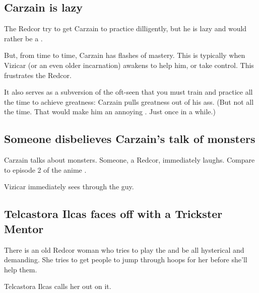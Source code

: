 \begin{garbage}
\subsection{Carzain is lazy}
The Redcor try to get Carzain to practice dilligently, but he is lazy and would rather be a \boheme. 

But, from time to time, Carzain has flashes of mastery. This is typically when Vizicar (or an even older incarnation) awakens to help him, or take control. This frustrates the Redcor. 

It also serves as a subversion of the oft-seen  that you must train and practice all the time to achieve greatness: Carzain pulls greatness out of his ass. (But not all the time. That would make him an annoying . Just once in a while.)









\subsection{Someone disbelieves Carzain's talk of monsters}
Carzain talks about monsters. Someone, a Redcor, immediately laughs.  Compare to episode 2 of the anime \cite{Anime:Gilgamesh}.

Vizicar immediately sees through the guy. 









\subsection{Telcastora Ilcas faces off with a Trickster Mentor}
There is an old Redcor woman who tries to play the  and be all hysterical and demanding. She tries to get people to jump through hoops for her before she'll help them. 

Telcastora Ilcas calls her out on it. 


\end{garbage}
